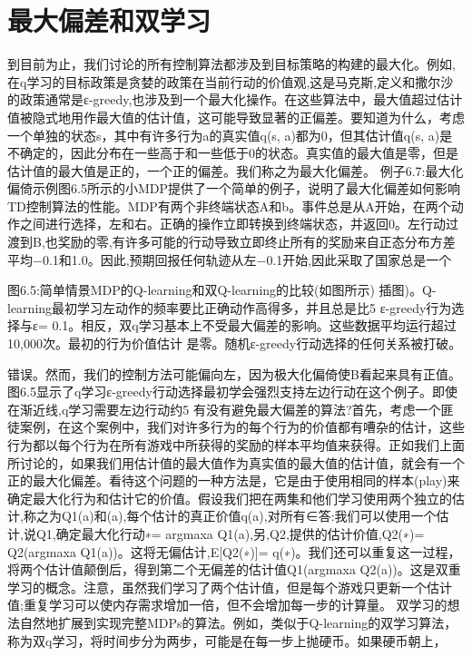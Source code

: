 \section{最大偏差和双学习}

到目前为止，我们讨论的所有控制算法都涉及到目标策略的构建的最大化。例如,在q学习的目标政策是贪婪的政策在当前行动的价值观,这是马克斯,定义和撒尔沙的政策通常是ε-greedy,也涉及到一个最大化操作。在这些算法中，最大值超过估计值被隐式地用作最大值的估计值，这可能导致显著的正偏差。要知道为什么，考虑一个单独的状态s，其中有许多行为a的真实值q(s, a)都为0，但其估计值q(s, a)是不确定的，因此分布在一些高于和一些低于0的状态。真实值的最大值是零，但是估计值的最大值是正的，一个正的偏差。我们称之为最大化偏差。
例子6.7:最大化偏倚示例图6.5所示的小MDP提供了一个简单的例子，说明了最大化偏差如何影响TD控制算法的性能。MDP有两个非终端状态A和b。事件总是从A开始，在两个动作之间进行选择，左和右。正确的操作立即转换到终端状态，并返回0。左行动过渡到B,也奖励的零,有许多可能的行动导致立即终止所有的奖励来自正态分布方差平均−0.1和1.0。因此,预期回报任何轨迹从左−0.1开始,因此采取了国家总是一个

图6.5:简单情景MDP的Q-learning和双Q-learning的比较(如图所示)
插图)。Q-learning最初学习左动作的频率要比正确动作高得多，并且总是比5%
ε-greedy行为选择与ε= 0.1。相反，双q学习基本上不受最大偏差的影响。这些数据平均运行超过10,000次。最初的行为价值估计
是零。随机ε-greedy行动选择的任何关系被打破。



错误。然而，我们的控制方法可能偏向左，因为极大化偏倚使B看起来具有正值。图6.5显示了q学习ε-greedy行动选择最初学会强烈支持左边行动在这个例子。即使在渐近线,q学习需要左边行动约5%
有没有避免最大偏差的算法?首先，考虑一个匪徒案例，在这个案例中，我们对许多行为的每个行为的价值都有嘈杂的估计，这些行为都以每个行为在所有游戏中所获得的奖励的样本平均值来获得。正如我们上面所讨论的，如果我们用估计值的最大值作为真实值的最大值的估计值，就会有一个正的最大化偏差。看待这个问题的一种方法是，它是由于使用相同的样本(play)来确定最大化行为和估计它的价值。假设我们把在两集和他们学习使用两个独立的估计,称之为Q1(a)和(a),每个估计的真正价值q(a),对所有∈答:我们可以使用一个估计,说Q1,确定最大化行动∗= argmaxa Q1(a),另,Q2,提供的估计价值,Q2(∗)= Q2(argmaxa Q1(a))。这将无偏估计,E[Q2(∗)]= q(∗)。我们还可以重复这一过程，将两个估计值颠倒后，得到第二个无偏差的估计值Q1(argmaxa Q2(a))。这是双重学习的概念。注意，虽然我们学习了两个估计值，但是每个游戏只更新一个估计值;重复学习可以使内存需求增加一倍，但不会增加每一步的计算量。
双学习的想法自然地扩展到实现完整MDPs的算法。例如，类似于Q-learning的双学习算法，称为双q学习，将时间步分为两步，可能是在每一步上抛硬币。如果硬币朝上，


